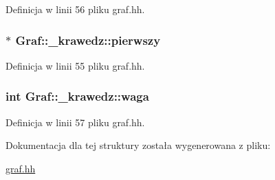 \-Definicja w linii 56 pliku graf.\-hh.

\hypertarget{struct_graf_1_1__krawedz_adba487ff1b27ab413c139dff7ef02313}{
\subsubsection[{pierwszy}]{$\ast$ {\bf \-Graf\-::\-\_\-krawedz\-::pierwszy}}}\label{struct_graf_1_1__krawedz_adba487ff1b27ab413c139dff7ef02313}


\-Definicja w linii 55 pliku graf.\-hh.

\hypertarget{struct_graf_1_1__krawedz_a32556165c01ba902034186551780c7f4}{
\subsubsection[{waga}]{\setlength{\rightskip}{0pt plus 5cm}int {\bf \-Graf\-::\-\_\-krawedz\-::waga}}}\label{struct_graf_1_1__krawedz_a32556165c01ba902034186551780c7f4}


\-Definicja w linii 57 pliku graf.\-hh.



\-Dokumentacja dla tej struktury została wygenerowana z pliku\-:\begin{DoxyCompactItemize}
\item 
\hyperlink{graf_8hh}{graf.\-hh}\end{DoxyCompactItemize}
